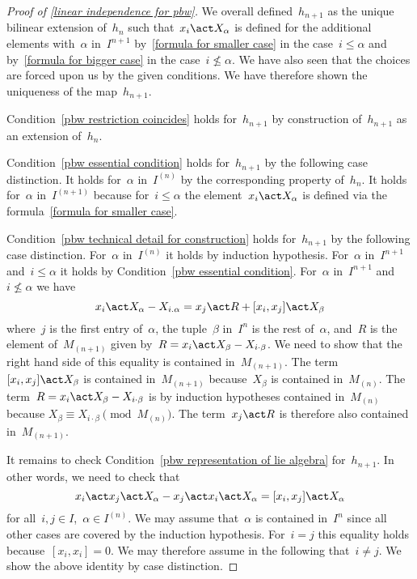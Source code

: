 \begin{proof}[Proof of \cref{linear independence for pbw}]
	We overall defined~$h_{n+1}$ as the unique bilinear extension of~$h_n$ such that~$x_i \act X_\alpha$ is defined for the additional elements with~$\alpha$ in~$I^{n+1}$ by~\eqref{formula for smaller case} in the case~$i \leq \alpha$ and by~\eqref{formula for bigger case} in the case~$i \nleq \alpha$.
	We have also seen that the choices are forced upon us by the given conditions.
	We have therefore shown the uniqueness of the map~$h_{n+1}$.
	
	Condition~\ref{pbw restriction coincides} holds for~$h_{n+1}$ by construction of~$h_{n+1}$ as an extension of~$h_n$.

	Condition~\ref{pbw essential condition} holds for~$h_{n+1}$ by the following case distinction.
	It holds for~$\alpha$ in~$I^{(n)}$ by the corresponding property of~$h_n$.
	It holds for~$\alpha$ in~$I^{(n+1)}$ because for~$i \leq \alpha$ the element~$x_i \act X_\alpha$ is defined via the formula~\eqref{formula for smaller case}. 

	Condition~\ref{pbw technical detail for construction} holds for~$h_{n+1}$ by the following case distinction.
	For~$\alpha$ in~$I^{(n)}$ it holds by induction hypothesis.
	For~$\alpha$ in~$I^{n+1}$ and~$i \leq \alpha$ it holds by Condition~\ref{pbw essential condition}.
	For~$\alpha$ in~$I^{n+1}$ and~$i \nleq \alpha$ we have
	\[
		x_i \act X_\alpha - X_{i.\alpha}
		=
		x_j \act R + [x_i, x_j] \act X_\beta
	\]
	where~$j$ is the first entry of~$\alpha$, the tuple~$\beta$ in~$I^n$ is the rest of~$\alpha$, and~$R$ is the element of~$M_{(n+1)}$ given by~$R = x_i \act X_\beta - X_{i \cdot \beta}$.
	We need to show that the right hand side of this equality is contained in~$M_{(n+1)}$.
	The term~$[x_i, x_j] \act X_\beta$ is contained in~$M_{(n+1)}$ because~$X_\beta$ is contained in~$M_{(n)}$.
	The term~$R = x_i \act X_\beta - X_{i \cdot \beta}$ is by induction hypotheses contained in~$M_{(n)}$ because $X_\beta \equiv X_{i \cdot \beta} \pmod{M_{(n)}}$.
	The term~$x_j \act R$ is therefore also contained in~$M_{(n+1)}$.

	It remains to check Condition~\ref{pbw representation of lie algebra} for~$h_{n+1}$.
	In other words, we need to check that
	\[
		x_i \act x_j \act X_\alpha - x_j \act x_i \act X_\alpha
		=
		[x_i, x_j] \act X_\alpha
	\]
	for all~$i, j \in I$,~$\alpha \in I^{(n)}$.
	We may assume that~$\alpha$ is contained in~$I^n$ since all other cases are covered by the induction hypothesis.
	For~$i = j$ this equality holds because~$[x_i, x_i] = 0$.
	We may therefore assume in the following that~$i \neq j$.
	We show the above identity by case distinction.
	

\end{proof}
